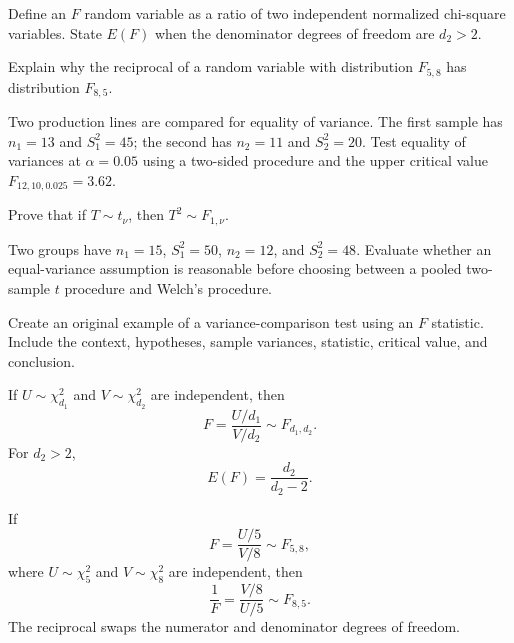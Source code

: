 \begin{problema}\label{prob:20ee012}
Define an $F$ random variable as a ratio of two independent normalized chi-square variables. State $E(F)$ when the denominator degrees of freedom are $d_2>2$.
\end{problema}

\begin{problema}\label{prob:2e8078c}
Explain why the reciprocal of a random variable with distribution $F_{5,8}$ has distribution $F_{8,5}$.
\end{problema}

\begin{problema}\label{prob:b47df2a}
Two production lines are compared for equality of variance. The first sample has $n_1=13$ and $S_1^2=45$; the second has $n_2=11$ and $S_2^2=20$. Test equality of variances at $\alpha=0.05$ using a two-sided procedure and the upper critical value $F_{12,10,0.025}=3.62$.
\end{problema}

\begin{problema}\label{prob:23d903e}
Prove that if $T\sim t_\nu$, then $T^2\sim F_{1,\nu}$.
\end{problema}

\begin{problema}\label{prob:e04a795}
Two groups have $n_1=15$, $S_1^2=50$, $n_2=12$, and $S_2^2=48$. Evaluate whether an equal-variance assumption is reasonable before choosing between a pooled two-sample $t$ procedure and Welch's procedure.
\end{problema}

\begin{problema}\label{prob:6277cc2}
Create an original example of a variance-comparison test using an $F$ statistic. Include the context, hypotheses, sample variances, statistic, critical value, and conclusion.
\end{problema}

\begin{solproblema}[prob:20ee012]
If $U\sim\chi^2_{d_1}$ and $V\sim\chi^2_{d_2}$ are independent, then
\[
	F=\frac{U/d_1}{V/d_2}\sim F_{d_1,d_2}.
\]
For $d_2>2$,
\[
	E(F)=\frac{d_2}{d_2-2}.
\]
\end{solproblema}

\begin{solproblema}[prob:2e8078c]
If
\[
	F=\frac{U/5}{V/8}\sim F_{5,8},
\]
where $U\sim\chi^2_5$ and $V\sim\chi^2_8$ are independent, then
\[
	\frac1F=\frac{V/8}{U/5}\sim F_{8,5}.
\]
The reciprocal swaps the numerator and denominator degrees of freedom.
\end{solproblema}

